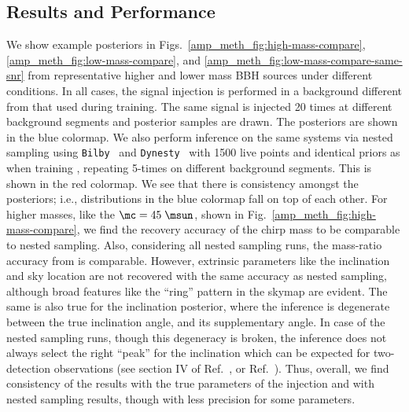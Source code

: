 \begin{refsection}
\section{\label{amp_meth_sec:results}Results and Performance}
We show example posteriors in Figs.~\ref{amp_meth_fig:high-mass-compare}, \ref{amp_meth_fig:low-mass-compare}, and \ref{amp_meth_fig:low-mass-compare-same-snr} from representative higher and lower mass BBH sources under different conditions. 
In all cases, the signal injection is performed in a background different from that used during training. 
The same signal is injected 20 times at different background segments and posterior samples are drawn. 
The posteriors are shown in the blue colormap. 
We also perform inference on the same systems via nested sampling using \texttt{Bilby}~\cite{Ashton_2019, Romero_Shaw_2020} and \texttt{Dynesty}~\cite{Speagle:2019ivv} with 1500 live points and identical priors as when training {\amplfi}, repeating 5-times on different background segments.
This is shown in the red colormap. 
We see that there is consistency amongst the {\amplfi} posteriors; i.e., distributions in the blue colormap fall on top of each other.
For higher masses, like the $\mc = 45\;\msun$, shown in Fig.~\ref{amp_meth_fig:high-mass-compare}, we find the recovery accuracy of the chirp mass to be comparable to nested sampling. 
Also, considering all nested sampling runs, the mass-ratio accuracy from {\amplfi} is comparable. 
However, extrinsic parameters like the inclination and sky location are not recovered with the same accuracy as nested sampling, although broad features like the ``ring'' pattern in the skymap are evident. 
The same is also true for the inclination posterior, where the inference is degenerate between the true inclination angle, and its supplementary angle. 
In case of the nested sampling runs, though this degeneracy is broken, the inference does not always select the right ``peak'' for the inclination which can be expected for two-detection observations (see section IV of Ref.~\cite{CuFl1994}, or Ref.~\cite{Nissanke:2009kt}).
Thus, overall, we find consistency of the {\amplfi} results with the true parameters of the injection and with nested sampling results, though with less precision for some parameters.


\end{refsection}

